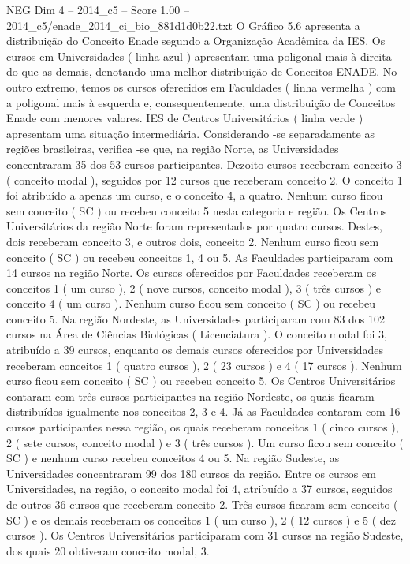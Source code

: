 \begin{textsample}{NEG Dim 4 – 2014\_c5 – Score 1.00 – 2014\_c5/enade\_2014\_ci\_bio\_881d1d0b22.txt}
O Gráfico 5.6 apresenta a distribuição do Conceito Enade segundo a Organização Acadêmica da IES.
Os cursos em Universidades ( linha azul ) apresentam uma poligonal mais à direita do que as demais, denotando uma melhor distribuição de Conceitos ENADE.
No outro extremo, temos os cursos oferecidos em Faculdades ( linha vermelha ) com a poligonal mais à esquerda e, consequentemente, uma distribuição de Conceitos Enade com menores valores.
IES de Centros Universitários ( linha verde ) apresentam uma situação intermediária.
Considerando -se separadamente as regiões brasileiras, verifica -se que, na região Norte, as Universidades concentraram 35 dos 53 cursos participantes.
Dezoito cursos receberam conceito 3 ( conceito modal ), seguidos por 12 cursos que receberam conceito 2.
O conceito 1 foi atribuído a apenas um curso, e o conceito 4, a quatro.
Nenhum curso ficou sem conceito ( SC ) ou recebeu conceito 5 nesta categoria e região.
Os Centros Universitários da região Norte foram representados por quatro cursos.
Destes, dois receberam conceito 3, e outros dois, conceito 2.
Nenhum curso ficou sem conceito ( SC ) ou recebeu conceitos 1, 4 ou 5.
As Faculdades participaram com 14 cursos na região Norte.
Os cursos oferecidos por Faculdades receberam os conceitos 1 ( um curso ), 2 ( nove cursos, conceito modal ), 3 ( três cursos ) e conceito 4 ( um curso ).
Nenhum curso ficou sem conceito ( SC ) ou recebeu conceito 5.
Na região Nordeste, as Universidades participaram com 83 dos 102 cursos na Área de Ciências Biológicas ( Licenciatura ).
O conceito modal foi 3, atribuído a 39 cursos, enquanto os demais cursos oferecidos por Universidades receberam conceitos 1 ( quatro cursos ), 2 ( 23 cursos ) e 4 ( 17 cursos ).
Nenhum curso ficou sem conceito ( SC ) ou recebeu conceito 5.
Os Centros Universitários contaram com três cursos participantes na região Nordeste, os quais ficaram distribuídos igualmente nos conceitos 2, 3 e 4.
Já as Faculdades contaram com 16 cursos participantes nessa região, os quais receberam conceitos 1 ( cinco cursos ), 2 ( sete cursos, conceito modal ) e 3 ( três cursos ).
Um curso ficou sem conceito ( SC ) e nenhum curso recebeu conceitos 4 ou 5.
Na região Sudeste, as Universidades concentraram 99 dos 180 cursos da região.
Entre os cursos em Universidades, na região, o conceito modal foi 4, atribuído a 37 cursos, seguidos de outros 36 cursos que receberam conceito 2.
Três cursos ficaram sem conceito ( SC ) e os demais receberam os conceitos 1 ( um curso ), 2 ( 12 cursos ) e 5 ( dez cursos ).
Os Centros Universitários participaram com 31 cursos na região Sudeste, dos quais 20 obtiveram conceito modal, 3.

\end{textsample}
